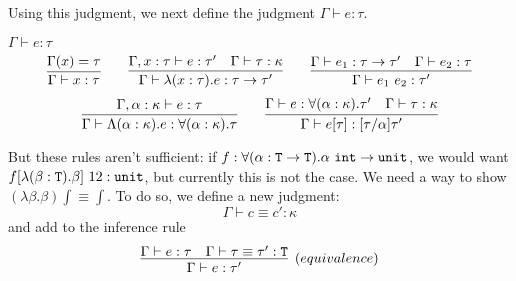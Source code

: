 Using this judgment, we next define the judgment $\Gamma \vdash e : \tau$.

\begin{judgment}
$\Gamma \vdash e : \tau$
\[
  \infer{\Gamma \vdash x : \tau}{\Gamma(x) = \tau}
  \qquad
  \infer{\Gamma \vdash \lambda(x : \tau).e : \tau \rightarrow \tau'}
        {\Gamma, x : \tau \vdash e : \tau'
        &\Gamma \vdash \tau : \kappa
        }
  \qquad
  \infer{\Gamma \vdash e_1 ~ e_2 : \tau'}
        {\Gamma \vdash e_1 : \tau \rightarrow \tau'
        &\Gamma \vdash e_2 : \tau
        }
\]
\[
  \infer{\Gamma \vdash \Lambda (\alpha : \kappa).e : \forall (\alpha : \kappa).\tau}
        {\Gamma, \alpha : \kappa \vdash e : \tau}
  \qquad
  \infer{\Gamma \vdash e[\tau] : [\tau / \alpha]\tau'}
        {\Gamma \vdash e : \forall(\alpha : \kappa).\tau'
        &\Gamma \vdash \tau : \kappa
        }
\]
\end{judgment}

But these rules aren't sufficient: if
$f : \forall(\alpha : \textnormal{\texttt{T}} \rightarrow \textnormal{\texttt{T}}). \alpha~\textnormal{\texttt{int}} \rightarrow \textnormal{\texttt{unit}}$,
we would want \mbox{$f[\lambda(\beta : \textnormal{\texttt{T}}).\beta]~12 : \textnormal{\texttt{unit}}$}, but
currently this is not the case. We need a way to show
\mbox{$(\lambda \beta. \beta) \int \equiv \int$}. To do so,
we define a new judgment:
\[\Gamma \vdash c \equiv c' : \kappa\]
and add to  the inference rule
\[\infer[(equivalence)]{\Gamma \vdash e : \tau'}
  {\Gamma \vdash e : \tau
  &\Gamma \vdash \tau \equiv \tau' : \T
  }
\]

